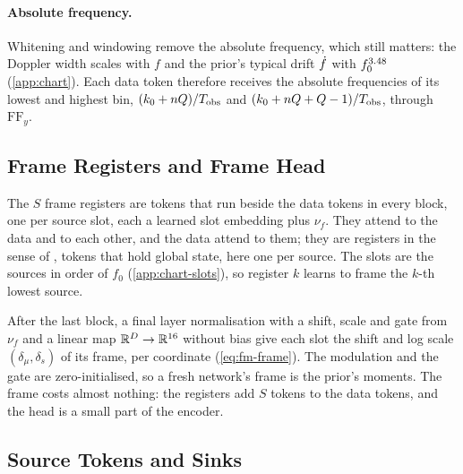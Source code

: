 \paragraph{Absolute frequency.}
Whitening and windowing remove the absolute frequency, which still matters: the Doppler width
scales with $f$ and the prior's typical drift $\dot f$ with $f_0^{3.48}$
(\cref{app:chart}). Each data token therefore receives the absolute frequencies of its lowest and
highest bin, $(k_0 + nQ)/T_{\rm obs}$ and $(k_0 + nQ + Q - 1)/T_{\rm obs}$, through $\mathrm{FF}_y$.

\subsection{Frame Registers and Frame Head}
\label{app:network-frame}

The $S$ frame registers are tokens that run beside the data tokens in every block, one per source
slot, each a learned slot embedding plus $\nu_f$. They attend to the data and to each other, and
the data attend to them; they are registers in the sense of \citet{darcet2024vision}, tokens that
hold global state, here one per source. The slots are the sources in order of $f_0$
(\cref{app:chart-slots}), so register $k$ learns to frame the $k$-th lowest source.

After the last block, a final layer normalisation with a shift, scale and gate from $\nu_f$ and a
linear map $\mathbb{R}^D\to\mathbb{R}^{16{}}$ without bias give each slot the shift and log scale
$(\delta_\mu,\delta_s)$ of its frame, per coordinate (\cref{eq:fm-frame}). The modulation and the
gate are zero-initialised, so a fresh network's frame is the prior's moments. The frame costs almost
nothing: the registers add $S$ tokens to the data tokens, and the head is a small part of the
encoder.

\subsection{Source Tokens and Sinks}
\label{app:network-sources}


